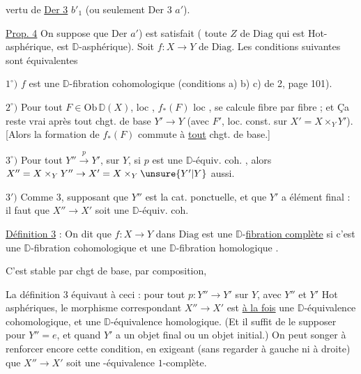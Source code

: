 

vertu de \uline{Der 3} $b'_1$ (ou seulement Der 3 $a'$).


\uline{Prop. 4} On suppose que Der $a'$) est satisfait ( toute $Z$ de $\mathrm{Diag}$ qui est Hot-asphérique, est  $\mathbb D$-asphérique). Soit $f:X\to Y$ de $\mathrm{Diag}$. Les conditions suivantes sont équivalentes

$1^\circ)$ $f$ est une $\mathbb D$-fibration cohomologique  (conditions a) b) c) de  2, page 101).

$2^\circ)$ Pour tout $F\in\mathrm{Ob}\,\mathbb D(X)$, loc , $f_*(F)$  loc , se calcule fibre par fibre ; et Ça reste vrai après tout chgt. de base $Y'\to Y$ (avec $F'$, loc. const. sur $X'=X\times_Y Y'$). [Alors la formation de $f_*(F)$ commute à \uline{tout} chgt. de base.]

$3^\circ)$ Pour tout $Y''\overset{p}{\longrightarrow}Y'$, sur $Y$, si $p$ est une $\mathbb D$-équiv. coh. , alors $X''=X\times_Y Y''\to X'=X\times_Y\unsure{Y'|Y}$ aussi.

$3')$ Comme 3,  supposant que $Y''$ est la cat. ponctuelle, et que $Y'$ a  élément final :  il faut que $X''\to X'$ soit une $\mathbb D$-équiv. coh.



\uline{Définition 3} : On dit que $f:X\to Y$ dans $\mathrm{Diag}$ est une $\mathbb D$-\uline{fibration complète} si c'est une $\mathbb D$-fibration cohomologique  et une $\mathbb D$-fibration homologique .

C'est stable par chgt de base, par composition,


La définition 3 équivaut à ceci : pour tout $p:Y''\to Y'$ sur $Y$, avec $Y''$ et $Y'$ Hot asphériques, le morphisme correspondant $X''\to X'$ est \uline{à la fois} une $\mathbb D$-équivalence cohomologique, et une $\mathbb D$-équivalence homologique. (Et il suffit \unsure{$=$} de le supposer pour $Y''=e$, et quand $Y'$ a un objet final ou un objet initial.) On peut songer à renforcer encore cette condition, en exigeant (sans regarder à gauche ni à droite) que $X''\to X'$ soit une -équivalence $1$-complète.

